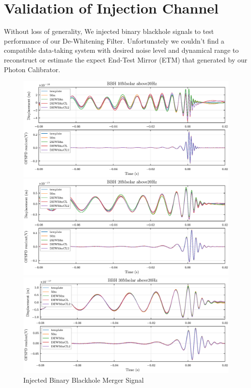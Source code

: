 




\chapter{Validation of Injection Channel}

Without loss of generality, We injected binary blackhole signals to test performance of our De-Whitening Filter. Unfortunately we couldn't find a compatible data-taking system with desired noise level and dynamical range to reconstruct or estimate the expect End-Test Mirror (ETM) that generated by our Photon Calibrator. 

  

\begin{figure}[hbt!]
\centering
\includegraphics[width=\textwidth]{figure/inj/10.eps}


\includegraphics[width=\textwidth]{figure/inj/20.eps}


\includegraphics[width=\textwidth]{figure/inj/30.eps}
\caption{Injected Binary Blackhole Merger Signal}\label{fig:bbhinj}
\end{figure}


